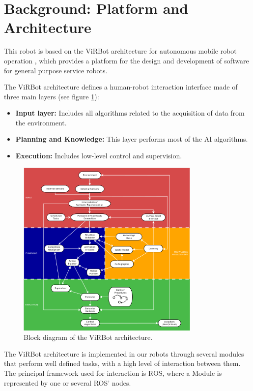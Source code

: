 \documentclass{llncs}
\begin{document}

\section{Background: Platform and Architecture}\label{sec:background}

This robot is based on the ViRBot architecture for autonomous mobile robot operation \cite{virbot}, which provides a platform for the design and development of software for general purpose service robots. 

The ViRBot architecture defines a human-robot interaction interface made of three main layers (see figure \ref{fig:virbot}):

\begin{itemize}
	\item \textbf{Input layer:} Includes all algorithms related to the acquisition of data from the environment. 
	\item \textbf{Planning and Knowledge:} This layer performs most of the AI algorithms.
	\item \textbf{Execution:} Includes low-level control and supervision. 
\end{itemize}

\begin{figure}[h]
	\centering
	\includegraphics[width=0.8\textwidth]{Figures/ViRBot.png}
	\caption{Block diagram of the ViRBot architecture.}
	\label{fig:virbot}
\end{figure}

The ViRBot architecture is implemented in our robots through several modules that perform well defined tasks, with a high level of interaction between them. The principal framework used for interaction is ROS, where a Module is represented by one or several ROS' nodes.
\end{document}
